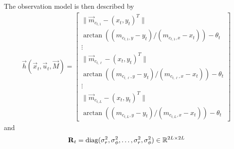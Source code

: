 The observation model is then described by
\begin{align}
	\vec h(\vec x_t, \vec u_t, \vec M) =
									\begin{bmatrix}
										\|\vec m_{c_{t, 1}} - (x_t, y_t)^T\| \\
										\arctan\left((m_{c_{t, 1}, y} - y_t) / (m_{c_{t, 1}, x} - x_t) \right) - \theta_t \\
										\vdots \\
										\|\vec m_{c_{t, \ell}} - (x_t, y_t)^T\| \\
										\arctan\left((m_{c_{t, \ell}, y} - y_t) / (m_{c_{t, \ell}, x} - x_t) \right) - \theta_t \\
										\vdots \\
										\|\vec m_{c_{t, L}} - (x_t, y_t)^T\| \\
										\arctan\left((m_{c_{t, L}, y} - y_t) / (m_{c_{t, L}, x} - x_t) \right) - \theta_t
									\end{bmatrix}
\end{align}
and
\begin{align}
	\boldsymbol{\mathbf{R}}_t = \operatorname{diag}(\sigma^2_r, \sigma^2_\phi, \dotsc, \sigma^2_r, \sigma^2_\phi) \in \mathbb R^{2L \times 2L}
\end{align}